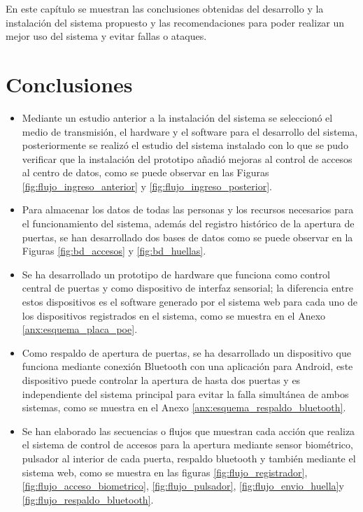 \documentclass[../principal]{subfiles}
\begin{document}
\espacio

  En este capítulo se muestran las conclusiones obtenidas del desarrollo y la instalación del sistema propuesto y las recomendaciones para poder realizar un mejor uso del sistema y evitar fallas o ataques.

  \section{Conclusiones}

  \begin{itemize}
    \item Mediante un estudio anterior a la instalación del sistema se seleccionó el medio de transmisión, el hardware y el software para el desarrollo del sistema, posteriormente se realizó el estudio del sistema instalado con lo que se pudo verificar que la instalación del prototipo añadió mejoras al control de accesos al centro de datos, como se puede observar en las Figuras \ref{fig:flujo_ingreso_anterior} y \ref{fig:flujo_ingreso_posterior}.
    \item Para almacenar los datos de todas las personas y los recursos necesarios para el funcionamiento del sistema, además del registro histórico de la apertura de puertas, se han desarrollado dos bases de datos como se puede observar en la Figuras \ref{fig:bd_accesos} y \ref{fig:bd_huellas}.
    \item Se ha desarrollado un prototipo de hardware que funciona como control central de puertas y como dispositivo de interfaz sensorial; la diferencia entre estos dispositivos es el software generado por el sistema web para cada uno de los dispositivos registrados en el sistema, como se muestra en el Anexo \ref{anx:esquema_placa_poe}.
    \item Como respaldo de apertura de puertas, se ha desarrollado un dispositivo que funciona mediante conexión Bluetooth con una aplicación para Android, este dispositivo puede controlar la apertura de hasta dos puertas y es independiente del sistema principal para evitar la falla simultánea de ambos sistemas, como se muestra en el Anexo \ref{anx:esquema_respaldo_bluetooth}.
    \item Se han elaborado las secuencias o flujos que muestran cada acción que realiza el sistema de control de accesos para la apertura mediante sensor biométrico, pulsador al interior de cada puerta, respaldo bluetooth y también mediante el sistema web, como se muestra en las figuras \ref{fig:flujo_registrador}, \ref{fig:flujo_acceso_biometrico}, \ref{fig:flujo_pulsador}, \ref{fig:flujo_envio_huella}y  \ref{fig:flujo_respaldo_bluetooth}.

\end{itemize}
\end{document}
